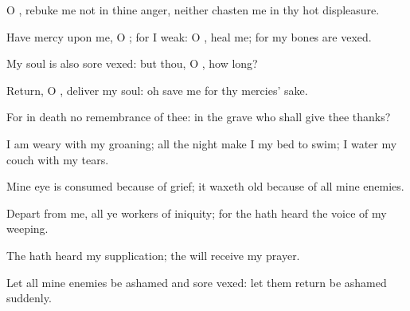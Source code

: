 {\Q {}O
{},
rebuke me not in thine
anger, neither
chasten me in thy hot
displeasure.


\par }{\Q {}Have
mercy upon me, O
{}; for I
{}
weak: O
{},
heal me; for my
bones are
vexed.


\par }{\Q {}My
soul is also
sore
vexed: but thou, O
{}, how long?


\par }{\Q {}Return, O
{},
deliver my
soul: oh
save me for thy
mercies’ sake.


\par }{\Q {}For in
death
{} no
remembrance of thee: in the
grave who shall give thee
thanks?


\par }{\Q {}I am
weary with my
groaning; all the
night make I my
bed to
swim; I
water my
couch with my
tears.


\par }{\Q {}Mine
eye is
consumed because of
grief; it waxeth
old because of all mine
enemies.


\par }{\BB \par }
{\Q {}Depart from me, all ye
workers of
iniquity; for the
{} hath
heard the
voice of my
weeping.


\par }{\Q {}The
{} hath
heard my
supplication; the
{} will
receive my
prayer.


\par }{\Q {}Let all mine
enemies be
ashamed and
sore
vexed: let them
return
{} be
ashamed
suddenly.




\par }
